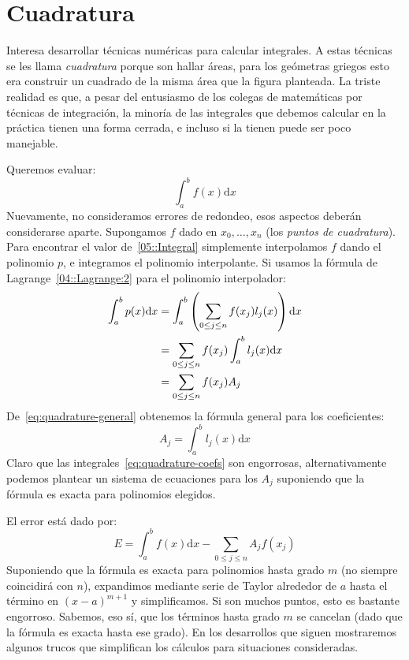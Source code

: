 

\chapter{Cuadratura}
\label{cha:cuadratura}

  Interesa desarrollar técnicas numéricas para calcular integrales.
  A estas técnicas se les llama \emph{cuadratura}
  porque son hallar áreas,
  para los geómetras griegos esto era construir un cuadrado de la misma área
  que la figura planteada.
  La triste realidad es que,
  a pesar del entusiasmo de los colegas de matemáticas
  por técnicas de integración,
  la minoría de las integrales que debemos calcular en la práctica
  tienen una forma cerrada,
  e incluso si la tienen puede ser poco manejable.

  Queremos evaluar:
  \begin{equation}
    \label{05::Integral}
    \int_a^b f(x) \mathrm{d} x
  \end{equation}
  Nuevamente,
  no consideramos errores de redondeo,
  esos aspectos deberán considerarse aparte.
  Supongamos \(f\) dado en \(x_0, \ldots, x_n\)
  (los \textit{puntos de cuadratura}).
  Para encontrar el valor de~\eqref{05::Integral}
  simplemente interpolamos \(f\)
  dando el polinomio \(p\),
  e integramos el polinomio interpolante.
  Si usamos la fórmula de Lagrange~\eqref{04::Lagrange:2}
  para el polinomio interpolador:
  \begin{align}
    \int_a^b p(x) \mathrm{d} x
      &= \int_a^b \left( \sum_{0 \le j \le n} f(x_j) l_j(x) \right)
                           \mathrm{d} x \notag \\
      &= \sum_{0 \le j \le n} f(x_j) \int_a^b l_j(x) \mathrm{d} x
                 \notag \\
      &= \sum_{0 \le j \le n} f(x_j) A_j
                  \label{eq:quadrature-general}
  \end{align}
  De~\eqref{eq:quadrature-general} obtenemos la fórmula general
  para los coeficientes:
  \begin{equation}
    \label{eq:quadrature-coefs}
    A_j
      = \int_a^b l_j(x) \mathrm{d} x
  \end{equation}
  Claro que las integrales~\eqref{eq:quadrature-coefs} son engorrosas,
  alternativamente podemos plantear un sistema de ecuaciones para los \(A_j\)
  suponiendo que la fórmula es exacta para polinomios elegidos.

  El error está dado por:
  \begin{equation}
    \label{eq:quadrature-error}
    E
      = \int_a^b f(x) \mathrm{d} x
          - \sum_{0 \le j \le n} A_j f(x_j)
  \end{equation}
  Suponiendo que la fórmula es exacta para polinomios hasta grado \(m\)
  (no siempre coincidirá con \(n\)),
  expandimos mediante serie de Taylor alrededor de \(a\)
  hasta el término en \((x - a)^{m + 1}\)
  y simplificamos.
  Si son muchos puntos,
  esto es bastante engorroso.
  Sabemos,
  eso sí,
  que los términos hasta grado \(m\) se cancelan
  (dado que la fórmula es exacta hasta ese grado).
  En los desarrollos que siguen mostraremos algunos trucos
  que simplifican los cálculos para situaciones consideradas.

